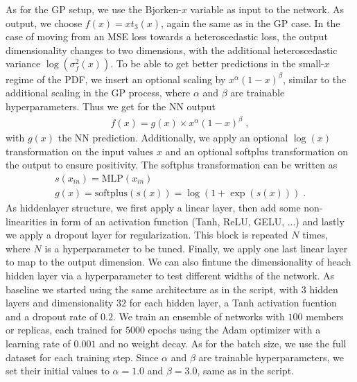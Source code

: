 \documentclass[11pt,a4paper]{article}
\begin{document}
As for the GP setup, we use the Bjorken-$x$ variable as input to the network. As output, we choose $f(x) = xt_3(x)$, again the same as in the GP case.
In the case of moving from an MSE loss towards a heteroscedastic loss, the output dimensionality changes to two dimensions, with the additional heteroscedastic variance $\log(\sigma_f^2(x))$. 
To be able to get better predictions in the small-$x$ regime of the PDF, we insert an optional scaling by $x^\alpha (1-x)^\beta$, similar to the additional scaling in the GP process, where $\alpha$ and $\beta$ are trainable hyperparameters. Thus we get for the NN output
%
\begin{align}
    f(x) = g(x) \times x^\alpha (1-x)^\beta \; ,
\end{align}
%
with $g(x)$ the NN prediction. 
Additionally, we apply an optional $\log(x)$ transformation on the input values $x$ and an optional softplus transformation on the output to ensure positivity. The softplus transformation can be written as
%
\begin{align}
    s(x_{in}) = \mathrm{MLP}(x_{in}) \nonumber \\
    g(x) = \mathrm{softplus}(s(x)) = \log(1+\exp(s(x))) \; .
\end{align}
%
As hiddenlayer structure, we first apply a linear layer, then add some non-linearities in form of an activation function (Tanh, ReLU, GELU, ...) and lastly we apply a dropout layer for regularization. This block is repeated $N$ times, where $N$ is a hyperparameter to be tuned. Finally, we apply one last linear layer to map to the output dimension.
We can also fintune the dimensionality of heach hidden layer via a hyperparameter to test different widths of the network.
As baseline we started using the same architecture as in the  script, with $3$ hidden layers and dimensionality $32$ for each hidden layer, a Tanh activation fucntion and a dropout rate of $0.2$. We train an ensemble of networks with $100$ members or replicas, each trained for $5000$ epochs using the Adam optimizer with a learning rate of $0.001$ and no weight decay. As for the batch size, we use the full dataset for each training step. Since $\alpha$ and $\beta$ are trainable hyperparameters, we set their initial values to $\alpha = 1.0$ and $\beta = 3.0$, same as in the  script.
\end{document}
